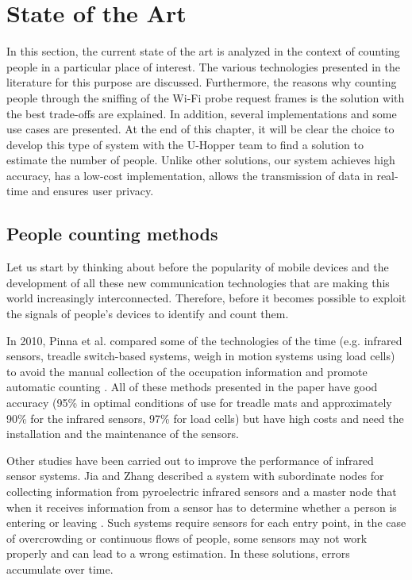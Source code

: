 \chapter{State of the Art}
\label{cha:soa}
\vspace{0.4 cm} 

In this section, the current state of the art is analyzed in the context of counting people in a particular place of interest. The various technologies presented in the literature for this purpose are discussed. Furthermore, the reasons why counting people through the sniffing of the Wi-Fi probe request frames is the solution with the best trade-offs are explained. In addition, several implementations and some use cases are presented.
At the end of this chapter, it will be clear the choice to develop this type of system with the U-Hopper team to find a solution to estimate the number of people. Unlike other solutions, our system achieves high accuracy, has a low-cost implementation, allows the transmission of data in real-time and ensures user privacy.


\section{People counting methods}
\label{sec:count}
\vspace{0.2 cm} 

Let us start by thinking about before the popularity of mobile devices and the development of all these new communication technologies that are making this world increasingly interconnected. Therefore, before it becomes possible to exploit the signals of people's devices to identify and count them.

In 2010, Pinna et al. compared some of the technologies of the time  (e.g. infrared sensors, treadle switch-based systems, weigh in motion systems using load cells) to avoid the manual collection of the occupation information and promote automatic counting \cite{pinna2010automatic}. All of these methods presented in the paper have good accuracy  (95\% in optimal conditions of use for treadle mats and approximately 90\% for the infrared sensors, 97\% for load cells) but have high costs and need the installation and the maintenance of the sensors.

Other studies have been carried out to improve the performance of infrared sensor systems. Jia and Zhang described a system with subordinate nodes for collecting information from pyroelectric infrared sensors and a master node that when it receives information from a sensor has to determine whether a person is entering or leaving \cite{jia2015application}. 
Such systems require sensors for each entry point, in the case of overcrowding or continuous flows of people, some sensors may not work properly and can lead to a wrong estimation. In these solutions, errors accumulate over time.

